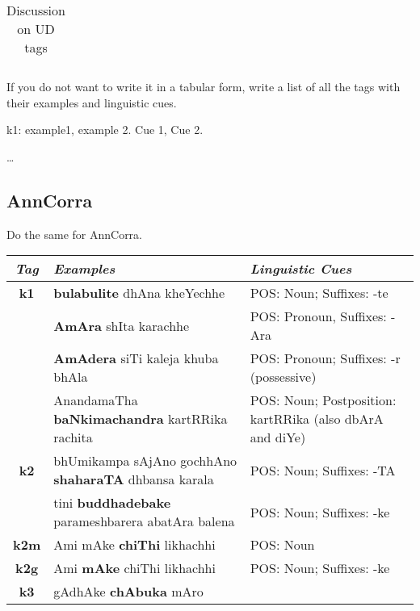 \documentclass[a4 paper]{article}
\begin{document}
\begin{longtable}{cp{}p{}}
\caption{Discussion on UD tags}
\label{tab:udtable}
\end{longtable}

If you do not want to write it in a tabular form, write a list of all the tags with their examples and linguistic cues.

 k1: example1, example 2. Cue 1, Cue 2.

 \dots

\subsection{AnnCorra}
Do the same for AnnCorra.

\begin{longtable}{cp{}p{}}
    \toprule
    \textit{Tag} & \textit{Examples} & \textit{Linguistic Cues} \\ 
    \toprule
    \addlinespace[0.5em]
    \textbf{k1}
                 & \textbf{bulabulite} dhAna kheYechhe
                 & POS: Noun; Suffixes: -te\\
    \addlinespace[0.5em]
                 & \textbf{AmAra} shIta karachhe
                 & POS: Pronoun, Suffixes: -Ara\\
    \addlinespace[0.5em]
                 & \textbf{AmAdera} siTi kaleja khuba bhAla
                 & POS: Pronoun; Suffixes: -r (possessive)\\
    \addlinespace[0.5em]
                 & AnandamaTha \textbf{baNkimachandra} kartRRika rachita
                 & POS: Noun; Postposition: kartRRika (also dbArA and diYe)\\
    \midrule
    \addlinespace[0.5em]
    \textbf{k2}
                 & bhUmikampa sAjAno gochhAno \textbf{shaharaTA} dhbansa karala
                 & POS: Noun; Suffixes: -TA\\
    \addlinespace[0.5em]
                 & tini \textbf{buddhadebake} parameshbarera abatAra balena
                 & POS: Noun; Suffixes: -ke\\
    \midrule
    \addlinespace[0.5em]
    \textbf{k2m}
                 & Ami mAke \textbf{chiThi} likhachhi
                 & POS: Noun\\
    \midrule
    \addlinespace[0.5em]
    \textbf{k2g}
                 & Ami \textbf{mAke} chiThi likhachhi
                 & POS: Noun; Suffixes: -ke\\
    \midrule
    \addlinespace[0.5em]
    \textbf{k3}
                 & gAdhAke \textbf{chAbuka} mAro

\end{longtable}
\end{document}
